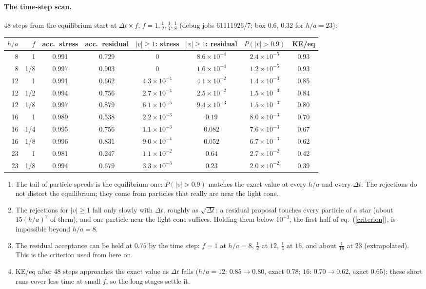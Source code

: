 \documentclass[11pt,aps,preprint,nofootinbib,superscriptaddress,tightenlines]{revtex4-2}
\def\Eq#1{eq.~(\ref{#1})}
\let\oldparagraph\paragraph
\renewcommand{\paragraph}{\par\bigskip\oldparagraph}
\begin{document}
\paragraph{The time-step scan.}  48 steps from the equilibrium start at $\Delta t\times f$,
$f=1,\tfrac12,\tfrac14,\tfrac18$ (debug jobs 61111926/7; box $0.6$, $0.32$ for $h/a=23$):
\begin{center}
\begin{tabular}{rrcccccc}
\hline
$h/a$ & $f$ & acc.\ stress & acc.\ residual & $|v|\ge1$: stress & $|v|\ge1$: residual & $P(|v|>0.9)$ & KE/eq \\ \hline
8 & 1 & 0.991 & 0.729 & 0 & $8.6\times10^{-4}$ & $2.4\times10^{-5}$ & 0.93 \\
8 & 1/8 & 0.997 & 0.903 & 0 & $1.6\times10^{-4}$ & $1.2\times10^{-5}$ & 0.93 \\
12 & 1 & 0.991 & 0.662 & $4.3\times10^{-4}$ & $4.1\times10^{-2}$ & $1.4\times10^{-3}$ & 0.85 \\
12 & 1/2 & 0.994 & 0.756 & $2.7\times10^{-4}$ & $2.5\times10^{-2}$ & $1.5\times10^{-3}$ & 0.84 \\
12 & 1/8 & 0.997 & 0.879 & $6.1\times10^{-5}$ & $9.4\times10^{-3}$ & $1.5\times10^{-3}$ & 0.80 \\
16 & 1 & 0.989 & 0.538 & $2.2\times10^{-3}$ & $0.19$ & $8.0\times10^{-3}$ & 0.70 \\
16 & 1/4 & 0.995 & 0.756 & $1.1\times10^{-3}$ & $0.082$ & $7.6\times10^{-3}$ & 0.67 \\
16 & 1/8 & 0.996 & 0.831 & $9.0\times10^{-4}$ & $0.052$ & $6.7\times10^{-3}$ & 0.62 \\
23 & 1 & 0.981 & 0.247 & $1.1\times10^{-2}$ & $0.64$ & $2.7\times10^{-2}$ & 0.42 \\
23 & 1/8 & 0.994 & 0.679 & $3.3\times10^{-3}$ & $0.23$ & $2.0\times10^{-2}$ & 0.39 \\
\hline
\end{tabular}
\end{center}
\begin{enumerate}
\item The tail of particle speeds is the equilibrium one: $P(|v|>0.9)$ matches the exact value at
  every $h/a$ and every $\Delta t$.  The rejections do not distort the equilibrium; they come from
  particles that really are near the light cone.
\item The rejections for $|v|\ge1$ fall only slowly with $\Delta t$, roughly as $\sqrt{\Delta t}$: a
  residual proposal touches every particle of a star (about $15(h/a)^2$ of them), and one particle
  near the light cone suffices.  Holding them below $10^{-3}$, the first half of
  \Eq{criterion}, is impossible beyond $h/a=8$.
\item The residual acceptance can be held at $0.75$ by the time step: $f=1$ at $h/a=8$, $\tfrac12$
  at $12$, $\tfrac14$ at $16$, and about $\tfrac1{16}$ at $23$ (extrapolated).  This is the criterion
  used from here on.
\item KE/eq after 48 steps approaches the exact value as $\Delta t$ falls ($h/a=12$: $0.85\to0.80$,
  exact $0.78$; $16$: $0.70\to0.62$, exact $0.65$); these short runs cover less time at small $f$,
  so the long stages settle it.
\end{enumerate}
\end{document}

